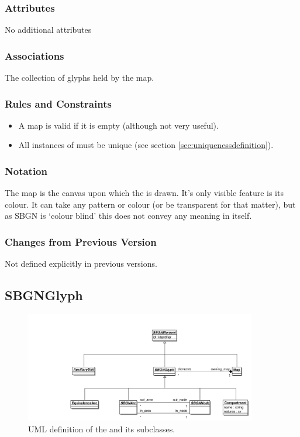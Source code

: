 \subsubsection{Attributes}

No additional attributes

\subsubsection{Associations}

\begin{attributes}
 The collection of glyphs held by the map. 
\end{attributes}

\subsubsection{Rules and Constraints}

\begin{itemize}
\item A map is valid if it is empty (although not very useful).
\item All instances of  must be unique (see
  section \ref{sec:uniquenessdefinition}).
\end{itemize}

\subsubsection{Notation}

The map is the canvas upon which the \PDl is drawn. It's only visible
feature is its colour. It can take any pattern or colour (or be
transparent for that matter), but as SBGN is `colour blind' this does
not convey any meaning in itself.

\subsubsection{Changes from Previous Version}

Not defined explicitly in previous versions.

\subsection{SBGNGlyph}
\label{defn:SBGNGlyph}

\begin{figure}[htb]
  \centering
  \includegraphics[width=0.9\textwidth]{images/glyphauxuml}
\caption{UML definition of the  and its subclasses.}
  \label{fig:glyphauxuml}
\end{figure}

